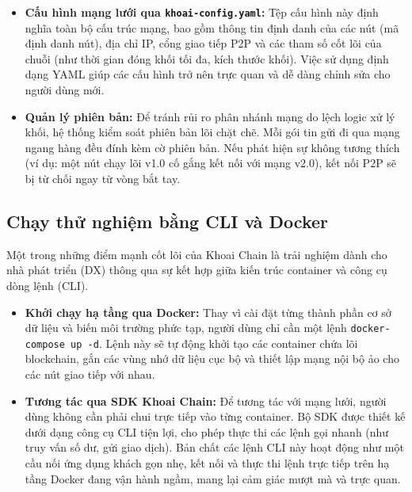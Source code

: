 \documentclass[12pt,a4paper]{article}
\begin{document}
\begin{itemize}
    \item \textbf{Cấu hình mạng lưới qua \texttt{khoai-config.yaml}:} Tệp cấu hình này định nghĩa toàn bộ cấu trúc mạng, bao gồm thông tin định danh của các nút (mã định danh nút), địa chỉ IP, cổng giao tiếp P2P và các tham số cốt lõi của chuỗi (như thời gian đóng khối tối đa, kích thước khối). Việc sử dụng định dạng YAML giúp các cấu hình trở nên trực quan và dễ dàng chỉnh sửa cho người dùng mới.
    \item \textbf{Quản lý phiên bản:} Để tránh rủi ro phân nhánh mạng do lệch logic xử lý khối, hệ thống kiểm soát phiên bản lõi chặt chẽ. Mỗi gói tin gửi đi qua mạng ngang hàng đều đính kèm cờ phiên bản. Nếu phát hiện sự không tương thích (ví dụ: một nút chạy lõi v1.0 cố gắng kết nối với mạng v2.0), kết nối P2P sẽ bị từ chối ngay từ vòng bắt tay.
\end{itemize}

\subsection{Chạy thử nghiệm bằng CLI và Docker}
Một trong những điểm mạnh cốt lõi của Khoai Chain là trải nghiệm dành cho nhà phát triển (DX) thông qua sự kết hợp giữa kiến trúc container và công cụ dòng lệnh (CLI).

\begin{itemize}
    \item \textbf{Khởi chạy hạ tầng qua Docker:} Thay vì cài đặt từng thành phần cơ sở dữ liệu và biến môi trường phức tạp, người dùng chỉ cần một lệnh \texttt{docker-compose up -d}. Lệnh này sẽ tự động khởi tạo các container chứa lõi blockchain, gắn các vùng nhớ dữ liệu cục bộ và thiết lập mạng nội bộ ảo cho các nút giao tiếp với nhau.
    \item \textbf{Tương tác qua SDK Khoai Chain:} Để tương tác với mạng lưới, người dùng không cần phải chui trực tiếp vào từng container. Bộ SDK được thiết kế dưới dạng công cụ CLI tiện lợi, cho phép thực thi các lệnh gọi nhanh (như truy vấn số dư, gửi giao dịch). Bản chất các lệnh CLI này hoạt động như một cầu nối ứng dụng khách gọn nhẹ, kết nối và thực thi lệnh trực tiếp trên hạ tầng Docker đang vận hành ngầm, mang lại cảm giác mượt mà và trực quan.
\end{itemize}
\end{document}
